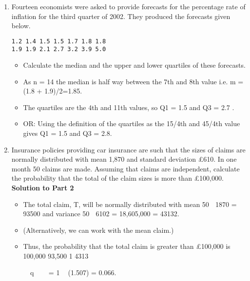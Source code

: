 \documentclass[a4paper,12pt]{article}
\begin{document}
\begin{enumerate}
\item  Fourteen economists were asked to provide forecasts for the percentage rate
of inflation for the third quarter of 2002. They produced the forecasts given
below.
\begin{verbatim}
1.2 1.4 1.5 1.5 1.7 1.8 1.8
1.9 1.9 2.1 2.7 3.2 3.9 5.0    
\end{verbatim}


\begin{itemize}
    \item Calculate the median and the upper and lower quartiles of these forecasts. 

\item As n = 14 the median is half way between the 7th and 8th value
i.e. m = (1.8 + 1.9)/2=1.85.
\item The quartiles are the 4th and 11th values, so Q1 = 1.5 and Q3 = 2.7 .
\item OR: Using the definition of the quartiles as the 15/4th and 45/4th value gives
Q1 = 1.5 and Q3 = 2.8.
\end{itemize}

\newpage
\item Insurance policies providing car insurance are such that the sizes of claims are
normally distributed with mean 1,870 and standard deviation £610. In one
month 50 claims are made. Assuming that claims are independent, calculate
the probability that the total of the claim sizes is more than £100,000. \\

\medskip
\noindent \textbf{Solution to Part 2}\\

\begin{itemize}
    \item The total claim, T, will be normally distributed with mean 50  1870 = 93500
and variance 50  6102 = 18,605,000 = 43132.
\item (Alternatively, we can work with the mean claim.)
\item Thus, the probability that the total claim is greater than £100,000 is
100,000 93,500
1
4313
\end{itemize}
  
 q 
 
= 1  (1.507) = 0.066.
\newpage

 
\end{enumerate}





\end{document}

